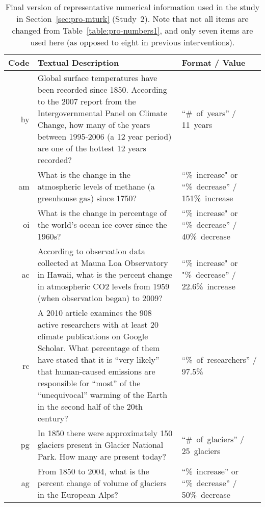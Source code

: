 \begin{table}
    \caption{Final version of representative numerical information used in the study in
        Section~\ref{sec:pro-mturk} (Study~2). Note that not all items are changed from
        Table~\ref{table:pro-numbers1}, and only seven items are used here (as
        opposed to eight in previous interventions).}
    \label{table:pro-numbers2}
    \begin{tabu}{>{\sffamily}rX[3]X[-1,l]}
        \toprule
        Code & Textual Description & Format / Value \\
        \midrule

hy &
Global surface temperatures have been recorded since 1850. According to the 2007
report from the Intergovernmental Panel on Climate Change, how many of the years
between 1995-2006 (a 12 year period) are one of the hottest 12 years recorded? &
“\#~of~years” /
11~years \\

am &
What is the change in the atmospheric levels of methane (a greenhouse gas) since
1750? &
“\%~increase" or “\%~decrease” /
151\%~increase \\

oi &
What is the change in percentage of the world's ocean ice cover since the 1960s?
&
“\%~increase" or “\%~decrease” /
40\%~decrease \\

ac &
According to observation data collected at Mauna Loa Observatory in Hawaii, what
is the percent change in atmospheric CO2 levels from 1959 (when observation
began) to 2009? &
“\%~increase" or "\%~decrease” /
22.6\%~increase \\

rc &
A 2010 article examines the 908 active researchers with at least 20 climate
publications on Google Scholar. What percentage of them have stated that it is
“very likely” that human-caused emissions are responsible for “most” of the
“unequivocal” warming of the Earth in the second half of the 20th century? &
“\%~of~researchers” /
97.5\% \\

pg &
In 1850 there were approximately 150 glaciers present in Glacier National Park.
How many are present today? &
“\#~of~glaciers” /
25~glaciers \\

ag &
From 1850 to 2004, what is the percent change of volume of glaciers in the
European Alps? &
“\%~increase” or “\%~decrease” /
50\%~decrease \\

\bottomrule
\end{tabu}
\end{table}

